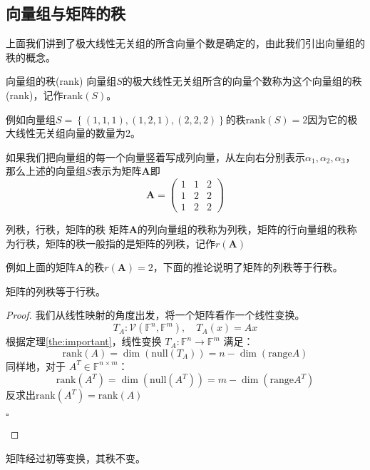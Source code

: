 \subsection{向量组与矩阵的秩}

上面我们讲到了极大线性无关组的所含向量个数是确定的，由此我们引出向量组的秩的概念。

\begin{definition}{向量组的秩(rank)}
	向量组$S$的极大线性无关组所含的向量个数称为这个向量组的秩(rank)，记作$\text{rank}(S)$。
\end{definition}

例如向量组$S=\left\{ (1,1,1),(1,2,1),(2,2,2) \right\}$的秩$\text{rank}(S)=2$因为它的极大线性无关组向量的数量为2。

如果我们把向量组的每一个向量竖着写成列向量，从左向右分别表示$\alpha_1,\alpha_2,\alpha_3$，那么上述的向量组$S$表示为矩阵$\mathbf{A}$即$$\mathbf{A}=\begin{pmatrix}
	1 & 1 & 2\\
	1 & 2 & 2\\
	1 & 2 & 2
\end{pmatrix}$$

\begin{definition}{列秩，行秩，矩阵的秩}
	矩阵$\mathbf{A}$的列向量组的秩称为列秩，矩阵的行向量组的秩称为行秩，矩阵的秩一般指的是矩阵的列秩，记作$r(\mathbf{A})$
\end{definition}

例如上面的矩阵$\mathbf{A}$的秩$r(\mathbf{A})=2$，下面的推论说明了矩阵的列秩等于行秩。

\begin{corollary}
	矩阵的列秩等于行秩。
\end{corollary}

\begin{proof}
	我们从线性映射的角度出发，将一个矩阵看作一个线性变换。
	$$
	T_A : \mathcal{V}(\mathbb{F}^n, \mathbb{F}^m), \quad T_A(x) = Ax
	$$
	根据定理\ref{the:important}，线性变换 $ T_A : \mathbb{F}^n \to \mathbb{F}^m $ 满足：$$\text{rank}(A) = \dim(\text{null}(T_A)) = n - \dim(\text{range} A)$$同样地，对于 $ A^T \in \mathbb{F}^{n \times m} $：$$\text{rank}(A^T) = \dim(\text{null}(A^T)) = m - \dim(\text{range} A^T)$$反求出$\text{rank}(A^T) = \text{rank}(A)$\begin{flushright}
		$\square$
	\end{flushright}
\end{proof}

\begin{corollary}
	矩阵经过初等变换，其秩不变。
\end{corollary}

